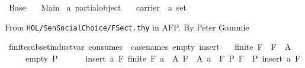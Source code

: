 %
\begin{isabellebody}%
\def\isabellecontext{Base}%
%
\isadelimtheory
%
\endisadelimtheory
%
\isatagtheory
{}\isamarkupfalse%
\ Base\isanewline
\ \ \ Main\isanewline
{}%
\endisatagtheory
{\isafoldtheory}%
%
\isadelimtheory
%
\endisadelimtheory
%
\isamarkuptrue%
\isamarkupfalse%
\ {}a\ partial{}object\ {}\isanewline
\ \ carrier\ {}{}\ {}{}a\ set{}%
\begin{isamarkuptext}%
From \texttt{HOL/SenSocialChoice/FSect.thy} in AFP. By Peter Gammie%
\end{isamarkuptext}%
\isamarkuptrue%
\isamarkupfalse%
\ finite{}subset{}induct{}var\ {}consumes\ {}{}\ case{}names\ empty\ insert{}{}\isanewline
\ \ \ {}finite\ F{}\ \ {}F\ {}\ A{}\isanewline
\ \ \ \ \ empty{}\ {}P\ {}{}{}\isanewline
\ \ \ \ \ insert{}\ {}{}a\ F{}\ {}finite\ F{}\ a\ {}\ A{}\ F\ {}\ A{}\ a\ {}\ F{}\ P\ F{}\ {}\ P\ {}insert\ a\ F{}{}\isanewline

\end{isabellebody}
